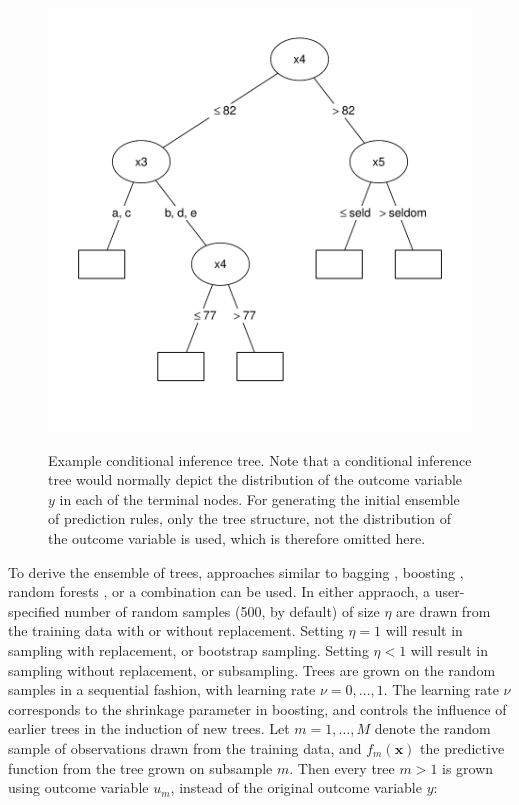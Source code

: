 \documentclass[nobf,doc]{apa}
\begin{document}
\begin{figure}[t!]
\includegraphics{prediction_rule_ensembles-example-tree}
\label{fig:regression_tree}
\caption{Example conditional inference tree. Note that a conditional inference tree would normally depict the distribution of the outcome variable $y$ in each of the terminal nodes. For generating the initial ensemble of prediction rules, only the tree structure, not the distribution of the outcome variable is used, which is therefore omitted here.}
\end{figure}

To derive the ensemble of trees, approaches similar to bagging \cite{Brei96bagging}, boosting \cite{FreuyShap95}, random forests \cite{Brei01RandFor}, or a combination can be used. In either appraoch, a user-specified number of random samples (500, by default) of size $\eta$ are drawn from the training data with or without replacement. Setting $\eta = 1$ will result in sampling with replacement, or bootstrap sampling. Setting $\eta < 1$ will result in sampling without replacement, or subsampling. %
Trees are grown on the random samples in a sequential fashion, with learning rate $\nu = 0, \dots, 1$. The learning rate $\nu$ corresponds to the shrinkage parameter in boosting, and controls the influence of earlier trees in the induction of new trees. Let $m = 1, \dots, M$ denote the random sample of observations drawn from the training data, and $f_m(\mathbf{x})$ the predictive function from the tree grown on subsample $m$. Then every tree $m > 1$ is grown using outcome variable $u_m$, instead of the original outcome variable $y$:
\end{document}
